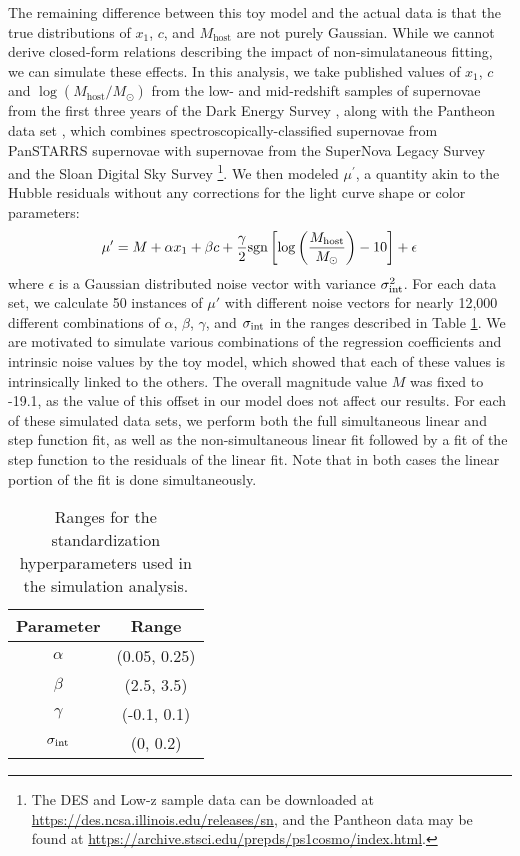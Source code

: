 The remaining difference between this toy model and the actual data is that the true distributions of $x_1$, $c$, and $M_\text{host}$ are not purely Gaussian. While we cannot derive closed-form relations describing the impact of non-simulataneous fitting, we can simulate these effects. In this analysis, we take published values of $x_1$, $c$ and $\log(M_\text{host}/M_\odot)$ from the low- and mid-redshift samples of supernovae from the first three years of the Dark Energy Survey \cite[][hereafter referred to as the Low-z and DES subsamples]{DES19}, along with the Pantheon data set \parencite{Scolnic18}, which combines spectroscopically-classified supernovae from PanSTARRS supernovae \cite[PS1;][]{Rest14, Scolnic14} with supernovae from the SuperNova Legacy Survey \cite[SNLS;][]{Conley11, Sullivan11} and the Sloan Digital Sky Survey \cite[SDSS;][]{Frieman08, Kessler09, Sako14} \footnote{The DES and Low-z sample data can be downloaded at \url{https://des.ncsa.illinois.edu/releases/sn}, and the Pantheon data may be found at \url{https://archive.stsci.edu/prepds/ps1cosmo/index.html}.}. We then modeled $\mu^\prime$, a quantity akin to the Hubble residuals without any corrections for the light curve shape or color parameters:
\begin{equation}
    \mu^\prime= M + \alpha x_1 + \beta c + \frac{\gamma}{2}\text{sgn}\left[\log\left(\frac{M_\text{host}}{M_\odot}\right) - 10 \right] + \epsilon
\end{equation}
where $\epsilon$ is a Gaussian distributed noise vector with variance $\sigma_{\text{int}}^2$. For each data set, we calculate 50 instances of $\mu'$ with different noise vectors for nearly 12,000 different combinations of $\alpha$, $\beta$, $\gamma$, and $\sigma_{\text{int}}$ in the ranges described in Table \ref{tab:sim_ranges}. We are motivated to simulate various combinations of the regression coefficients and intrinsic noise values by the toy model, which showed that each of these values is intrinsically linked to the others. The overall magnitude value $M$ was fixed to -19.1, as the value of this offset in our model does not affect our results. For each of these simulated data sets, we perform both the full simultaneous linear and step function fit, as well as the non-simultaneous linear fit followed by a fit of the step function to the residuals of the linear fit. Note that in both cases the linear portion of the fit is done simultaneously.

\begin{table}[]
    \centering
    \begin{tabular}{|c|c|}
    \hline
        Parameter & Range \\\hline
        $\alpha$ & (0.05, 0.25) \\
        $\beta$ & (2.5, 3.5) \\
        $\gamma$ & (-0.1, 0.1) \\
        $\sigma_{\text{int}}$ & (0, 0.2) \\\hline
    \end{tabular}
    \caption{Ranges for the standardization hyperparameters used in the simulation analysis.}
    \label{tab:sim_ranges}
\end{table}

